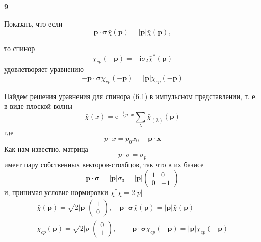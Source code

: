 \documentclass[a4paper,12pt]{article} %
\begin{document}
\begin{ttask}\textbf{9}


Показать, что если
$$
\boldsymbol{p} \cdot \boldsymbol{\sigma} \bar{\chi}(\boldsymbol{p})=|\boldsymbol{p}| \bar{\chi}(\boldsymbol{p}),
$$

то спинор
$$
\chi_{c p}(-\boldsymbol{p})=-\mathrm{i} \sigma_{2} \bar{\chi}^{*}(\boldsymbol{p})
$$
удовлетворяет уравнению
$$
-\boldsymbol{p} \cdot \boldsymbol{\sigma} \chi_{c p}(-\boldsymbol{p})=|\boldsymbol{p}| \chi_{c p}(-\boldsymbol{p})
$$



Найдем решения уравнения для спинора (6.1) в импульсном представлении, т. е. в виде плоской волны
$$
\bar{\chi}(x)=\mathrm{e}^{-\frac{\mathrm{i}}{\hbar} p \cdot x} \sum_{\lambda} \bar{\chi}_{(\lambda)}(\boldsymbol{p})
$$
где
$$
p \cdot x=p_{0} x_{0}-\boldsymbol{p} \cdot \boldsymbol{x}
$$
Как нам известно, матрица
$$
p \cdot \sigma=\sigma_{p}
$$
имеет пару собственных векторов-столбцов, так что в их базисе
$$
\boldsymbol{p} \cdot \boldsymbol{\sigma}=|\boldsymbol{p}| \sigma_{3}=|\boldsymbol{p}|\left(\begin{array}{rr}
	1 & 0 \\
	0 & -1
\end{array}\right)
$$
и, принимая условие нормировки $\bar{\chi}^{\dagger} \bar{\chi}=2|p|$
$$
\begin{array}{c}
	\bar{\chi}(\boldsymbol{p})=\sqrt{2|\boldsymbol{p}|}\left(\begin{array}{c}
		1 \\
		0
	\end{array}\right), \quad \boldsymbol{p} \cdot \boldsymbol{\sigma} \bar{\chi}(\boldsymbol{p})=|\boldsymbol{p}| \bar{\chi}(\boldsymbol{p}) \\
	\chi_{c p}(\boldsymbol{p})
	=
	\sqrt{2|p|}
	\left(\begin{array}{c}
		0 \\
		1
	\end{array}\right), 
\quad
-\boldsymbol{p} \cdot \boldsymbol{\sigma} \chi_{c p}(-\boldsymbol{p})
=
|\boldsymbol{p}| \chi_{c p}(-\boldsymbol{p})
\end{array}
$$















\end{ttask}
\end{document}
